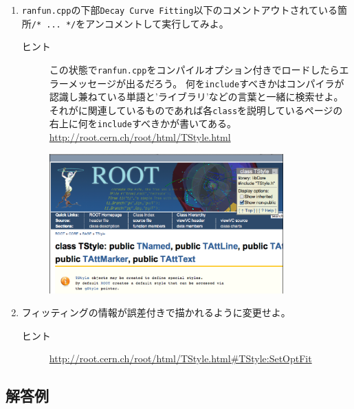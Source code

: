 \begin{enumerate}
   \item \verb|ranfun.cpp|の下部\verb|Decay Curve Fitting|以下のコメントアウトされている箇所\verb|/* ... */|をアンコメントして実行してみよ。
	 \begin{description}
	  \item[ヒント] この状態で\verb|ranfun.cpp|をコンパイルオプション付きでロードしたらエラーメッセージが出るだろう。
		     何を\verb|include|すべきかはコンパイラが認識し兼ねている単語と'ライブラリ'などの言葉と一緒に検索せよ。
		     それが\ROOT に関連しているものであれば各\verb|class|を説明しているページの右上に何を\verb|include|すべきかが書いてある。\\
		     \url{http://root.cern.ch/root/html/TStyle.html}
	 \end{description}
	 \begin{figure}[htbp]
	  \begin{center}
	   \includegraphics[width = 90mm]{./picture/classinclude.eps}
	  \end{center}
	  \label{Fig:classinclude}
	 \end{figure}
   \item フィッティングの情報が誤差付きで描かれるように変更せよ。
	 \begin{description}
	  \item[ヒント]  \url{http://root.cern.ch/root/html/TStyle.html#TStyle:SetOptFit}
	 \end{description}
  \end{enumerate}

  \subsection{解答例}

